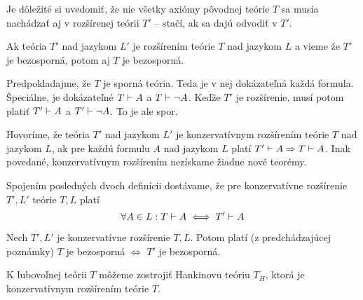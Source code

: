 \begin{poznamka}
    Je dôležité si uvedomiť, že nie všetky axiómy pôvodnej teórie $T$
    sa musia nachádzať aj v rozšírenej teórii $T'$ -- 
    stačí, ak sa dajú odvodiť v $T'$.
\end{poznamka}

\begin{poznamka}
 Ak teória $T'$ nad jazykom $L'$ je rozšírením teórie $T$ nad jazykom
 $L$ a vieme že $T'$ je bezosporná, potom aj $T$ je bezosporná.
\end{poznamka}
\begin{dokaz}
    Predpokladajme, že $T$ je sporná teória. Teda je v nej dokázateľná
    každá formula.
    Špeciálne, je dokázateľné $T \vdash A$ a $T \vdash \neg A$.
    Keďže $T'$ je rozšírenie, musí potom platiť
    $T' \vdash A$ a $T' \vdash \neg A$. To je ale spor.
\end{dokaz}

\begin{definicia}
    Hovoríme, že teória $T'$ nad jazykom $L'$ je konzervatívnym
    rozšírením teórie $T$ nad jazykom $L$, ak pre každú formulu
    $A$ nad jazykom $L$ platí $T' \vdash A \Rightarrow T \vdash A$.
    Inak povedané, konzervatívnym rozšírením nezískame žiadne nové 
    teorémy.
\end{definicia}

\begin{poznamka}
    Spojením posledných dvoch definícii dostávame, že pre
    konzervatívne rozšírenie $T',L'$ teórie $T,L$ platí
    \begin{equation*}
        \forall A \in L: T \vdash A \iff T' \vdash A
    \end{equation*}
\end{poznamka}

\begin{poznamka}
    Nech $T',L'$ je konzervatívne rozšírenie $T,L$. Potom platí (z
    predchádzajúcej poznámky)
    $T$ je bezosporná $\iff$ $T'$ je bezosporná.
\end{poznamka}

\begin{veta}[Hankinova] 
    K ľubovoľnej teórii $T$ môžeme zostrojiť Hankinovu
    teóriu $T_H$, ktorá je konzervatívnym rozšírením teórie $T$.
\end{veta}    

